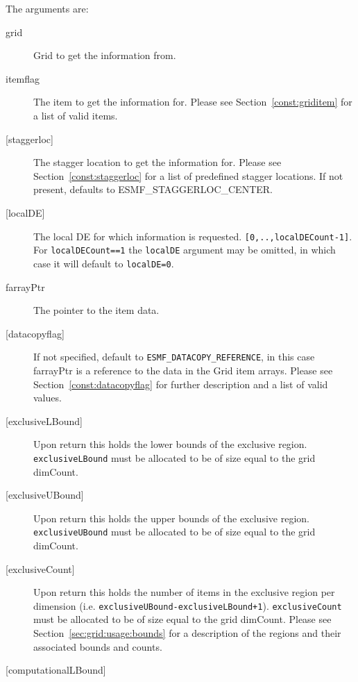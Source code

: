        The arguments are:
       \begin{description}
       \item[grid]
            Grid to get the information from.
       \item[itemflag]
            The item to get the information for. Please see Section~\ref{const:griditem} for a
            list of valid items.
       \item[{[staggerloc]}]
            The stagger location to get the information for.
            Please see Section~\ref{const:staggerloc} for a list
            of predefined stagger locations. If not present, defaults to ESMF\_STAGGERLOC\_CENTER.
       \item[{[localDE]}]
            The local DE for which information is requested. {\tt [0,..,localDECount-1]}.
            For {\tt localDECount==1} the {\tt localDE} argument may be omitted,
            in which case it will default to {\tt localDE=0}.
       \item[farrayPtr]
            The pointer to the item data.
       \item[{[datacopyflag]}]
            If not specified, default to {\tt ESMF\_DATACOPY\_REFERENCE}, in this case
            farrayPtr is a reference to the data in the Grid item arrays.
            Please see Section~\ref{const:datacopyflag} for further description and a
            list of valid values.
       \item[{[exclusiveLBound]}]
            Upon return this holds the lower bounds of the exclusive region.
            {\tt exclusiveLBound} must be allocated to be of size equal to the grid dimCount.
       \item[{[exclusiveUBound]}]
            Upon return this holds the upper bounds of the exclusive region.
            {\tt exclusiveUBound} must be allocated to be of size equal to the grid dimCount.
       \item[{[exclusiveCount]}]
            \begin{sloppypar}
            Upon return this holds the number of items in the exclusive region per dimension
            (i.e. {\tt exclusiveUBound-exclusiveLBound+1}). {\tt exclusiveCount} must
            be allocated to be of size equal to the grid dimCount.
            Please see Section~\ref{sec:grid:usage:bounds} for a description
            of the regions and their associated bounds and counts.
            \end{sloppypar}
       \item[{[computationalLBound]}]

\end{description}
